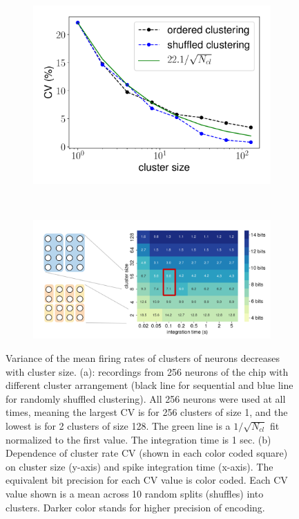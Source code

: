 \begin{figure}[h!]
    \centering
    \begin{subfigure}[b]{0.5\textwidth}
        \includegraphics[width=\textwidth]{img/chapter4/CV_clustering_at_50Hz.pdf}
        \caption{}
        \label{fig:variance_vs_cluster_size_a}
    \end{subfigure}\\
        \centering
    \begin{subfigure}[b]{0.7\textwidth}  
        \includegraphics[width=\textwidth]{img/chapter2/Cluster_size_tradeoff.png}
        \caption{}
        \label{fig:variance_vs_cluster_size_b}
    \end{subfigure}
    \caption[Variance of the mean firing rates of clusters of neurons decreases with cluster size]{Variance of the mean firing rates of clusters of neurons decreases with cluster size.
(a): recordings from 256 neurons of the chip with different cluster arrangement (black line for sequential and blue line for randomly shuffled clustering).
All 256 neurons were used at all times, meaning the largest CV is for 256 clusters of size 1, and the lowest is for 2 clusters of size 128.
The green line is a $1/\sqrt{N_{cl}}$ fit normalized to the first value.
The integration time is 1 sec.
(b) Dependence of cluster rate CV (shown in each color coded square) on cluster size (y-axis) and spike integration time (x-axis).
The equivalent bit precision for each CV value is color coded.
Each CV value shown is a mean across 10 random splits (shuffles) into clusters.
Darker color stands for higher precision of encoding.}
    \label{fig:variance_vs_cluster_size}
\end{figure}


